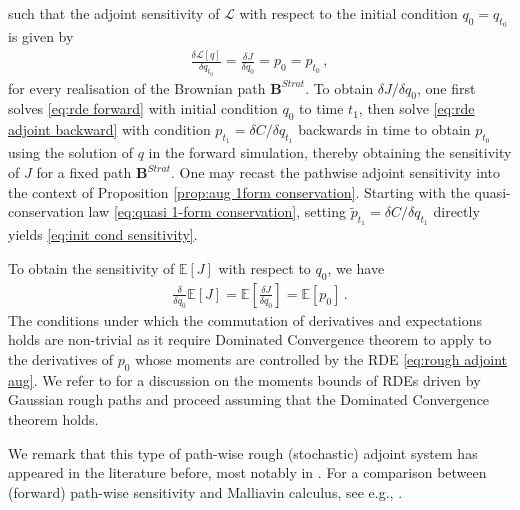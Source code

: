 \documentclass[11pt, oneside]{article}
\numberwithin{equation}{section}
\theoremstyle{definition}
\newcommand{\wt}[1]{\widetilde{#1}}
\newcommand{\mc}[1]{\mathcal{#1}}
\newcommand{\mcal}[1]{\mc{#1}}
\begin{document}
such that the adjoint sensitivity of $\mcal{L}$ with respect to the initial condition $q_0 = q_{t_0}$ is given by
\begin{align}
    \frac{\delta \mcal{L}[q]}{\delta q_{t_0}} = \frac{\delta J}{\delta q_0} = p_0 = p_{t_0}\,,\label{eq:init cond sensitivity}
\end{align}
for every realisation of the Brownian path $\mathbf{B}^{Strat}$. To obtain $\delta J/\delta q_0$, one first solves \eqref{eq:rde forward} with initial condition $q_0$ to time $t_1$, then solve \eqref{eq:rde adjoint backward} with condition $p_{t_1} = \delta C/\delta q_{t_1}$ backwards in time to obtain $p_{t_0}$ using the solution of $q$ in the forward simulation, thereby obtaining the sensitivity of $J$ for a fixed path $\mathbf{B}^{Strat}$. One may recast the pathwise adjoint sensitivity into the context of Proposition \ref{prop:aug 1form conservation}. Starting with the quasi-conservation law \eqref{eq:quasi 1-form conservation}, setting $\wt{p}_{t_1} = \delta C/\delta q_{t_1}$ directly yields \eqref{eq:init cond sensitivity}. 

To obtain the sensitivity of $\mathbb{E}[J]$ with respect to $q_0$, we have 
\begin{align}
    \frac{\delta }{\delta q_0} \mathbb{E}[J] = \mathbb{E}\left[\frac{\delta J}{\delta q_0} \right] = \mathbb{E}[p_0]\,.
\end{align}
The conditions under which the commutation of derivatives and expectations holds are non-trivial as it require Dominated Convergence theorem to apply to the derivatives of $p_0$ whose moments are controlled by the RDE \eqref{eq:rough adjoint aug}. We refer to \cite{CLL2013} for a discussion on the moments bounds of RDEs driven by Gaussian rough paths and proceed assuming that the Dominated Convergence theorem holds. 

We remark that this type of path-wise rough (stochastic) adjoint system has appeared in the literature before, most notably in \cite{Li2020}. For a comparison between (forward) path-wise sensitivity and Malliavin calculus, see e.g., \cite{Fourni1999}.
\end{document}
